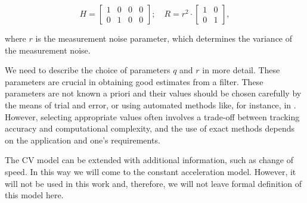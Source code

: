 \begin{equation}
    H =
    \begin{bmatrix}
        1 & 0 &0 & 0 \\
        0 & 1 &0 & 0
    \end{bmatrix};
    \quad
    R =
    r^{2}\cdot
    \begin{bmatrix}
        1 & 0 \\
        0 & 1
    \end{bmatrix},
\end{equation}

where $r$ is the measurement noise parameter, which determines the variance of the measurement noise.

We need to describe the choice of parameters $q$ and $r$ in more detail. These parameters are crucial in obtaining good estimates from a filter. These parameters are not known a priori and their values should be chosen carefully by the means of trial and error, or using automated methods like, for instance, in \cite{bulutProcessMeasurementNoise2011}. However, selecting appropriate values often involves a trade-off between tracking accuracy and computational complexity, and the use of exact methods depends on the application and one's requirements.

The CV model can be extended with additional information, such as change of speed. In this way we will come to the constant acceleration model. However, it will not be used in this work and, therefore, we will not leave formal definition of this model here.
